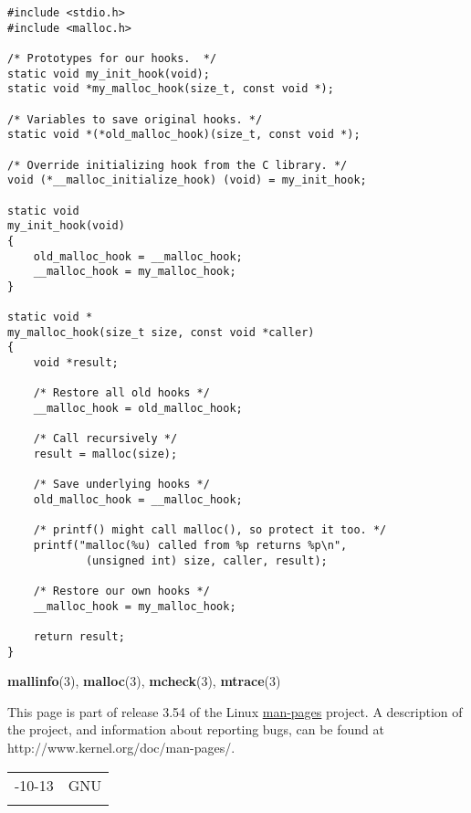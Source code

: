 \documentclass[]{article}
\let\realtextbf=\textbf
\renewcommand{\textbf}[1]{\textcolor{boldcolor}{\realtextbf{#1}}}
\renewcommand{\emph}[1]{\underline{#1}}
\begin{document}
\begin{verbatim}
#include <stdio.h>
#include <malloc.h>

/* Prototypes for our hooks.  */
static void my_init_hook(void);
static void *my_malloc_hook(size_t, const void *);

/* Variables to save original hooks. */
static void *(*old_malloc_hook)(size_t, const void *);

/* Override initializing hook from the C library. */
void (*__malloc_initialize_hook) (void) = my_init_hook;

static void
my_init_hook(void)
{
    old_malloc_hook = __malloc_hook;
    __malloc_hook = my_malloc_hook;
}

static void *
my_malloc_hook(size_t size, const void *caller)
{
    void *result;

    /* Restore all old hooks */
    __malloc_hook = old_malloc_hook;

    /* Call recursively */
    result = malloc(size);

    /* Save underlying hooks */
    old_malloc_hook = __malloc_hook;

    /* printf() might call malloc(), so protect it too. */
    printf("malloc(%u) called from %p returns %p\n",
            (unsigned int) size, caller, result);

    /* Restore our own hooks */
    __malloc_hook = my_malloc_hook;

    return result;
}
\end{verbatim}


\textbf{mallinfo}(3), \textbf{malloc}(3), \textbf{mcheck}(3),
\textbf{mtrace}(3)


This page is part of release 3.54 of the Linux \emph{man-pages} project.
A description of the project, and information about reporting bugs, can
be found at http://www.kernel.org/doc/man-pages/.

\begin{longtable}[c]{@{}ll@{}}
\toprule\addlinespace
2010-10-13 & GNU
\\\addlinespace
\bottomrule
\end{longtable}
\end{document}
